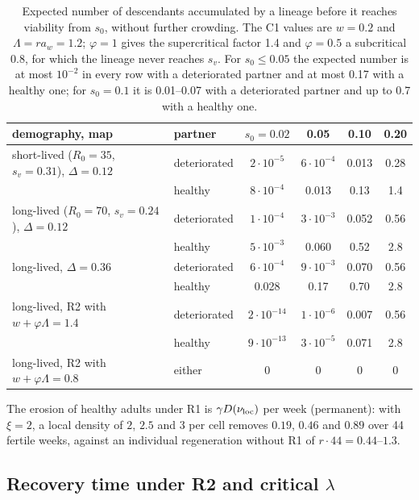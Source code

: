 \begin{table}[h]
\centering\small
\begin{tabular}{llcccc}
\toprule
demography, map & partner & $s_0=0.02$ & 0.05 & 0.10 & 0.20\\
\midrule
short-lived ($R_0=35$, $s_v=0.31$), $\Delta=0.12$ & deteriorated & $2\cdot10^{-5}$ & $6\cdot10^{-4}$ & 0.013 & 0.28\\
 & healthy & $8\cdot10^{-4}$ & 0.013 & 0.13 & 1.4\\
long-lived ($R_0=70$, $s_v=0.24$), $\Delta=0.12$ & deteriorated & $1\cdot10^{-4}$ & $3\cdot10^{-3}$ & 0.052 & 0.56\\
 & healthy & $5\cdot10^{-3}$ & 0.060 & 0.52 & 2.8\\
long-lived, $\Delta=0.36$ & deteriorated & $6\cdot10^{-4}$ & $9\cdot10^{-3}$ & 0.070 & 0.56\\
 & healthy & 0.028 & 0.17 & 0.70 & 2.8\\
long-lived, R2 with $w+\varphi\Lambda=1.4$ & deteriorated & $2\cdot10^{-14}$ & $1\cdot10^{-6}$ & 0.007 & 0.56\\
 & healthy & $9\cdot10^{-13}$ & $3\cdot10^{-5}$ & 0.071 & 2.8\\
long-lived, R2 with $w+\varphi\Lambda=0.8$ & either & 0 & 0 & 0 & 0\\
\bottomrule
\end{tabular}
\caption{Expected number of descendants accumulated by a lineage before it reaches viability from $s_0$, without
further crowding. The \textsf{C1} values are $w=0.2$ and $\Lambda=ra_w=1.2$; $\varphi=1$ gives the supercritical
factor 1.4 and $\varphi=0.5$ a subcritical 0.8, for which the lineage never reaches $s_v$. For $s_0\le0.05$ the
expected number is at most $10^{-2}$ in every row with a deteriorated partner and at most 0.17 with a healthy one;
for $s_0=0.1$ it is 0.01--0.07 with a deteriorated partner and up to 0.7 with a healthy one.}
\label{tab:lineage}
\end{table}

The erosion of healthy adults under R1 is $\gamma D(\nu_{\rm loc})$ per week
(permanent): with $\xi=2$, a local density of $2$, $2.5$ and $3$ per cell
removes $0.19$, $0.46$ and $0.89$ over 44 fertile weeks, against an individual
regeneration without R1 of $r\cdot44=0.44$--$1.3$.

\subsection{Recovery time under R2 and critical $\lambda$}
\label{app:r2}

